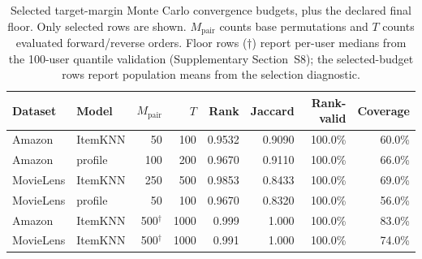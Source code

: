 \begin{table}[t]\centering\small
\caption{Selected target-margin Monte Carlo convergence budgets, plus the declared final floor. Only selected rows are shown. $M_{\mathrm{pair}}$ counts base permutations and $T$ counts evaluated forward/reverse orders. Floor rows ($\dagger$) report per-user medians from the 100-user quantile validation (Supplementary Section~S8); the selected-budget rows report population means from the selection diagnostic.}
\label{tab:convergence}
\begin{tabular}{llrrrrrr}
\toprule
Dataset & Model & $M_{\mathrm{pair}}$ & $T$ & Rank & Jaccard & Rank-valid & Coverage \\
\midrule
Amazon & ItemKNN & 50 & 100 & 0.9532 & 0.9090 & 100.0\% & 60.0\% \\
Amazon & profile & 100 & 200 & 0.9670 & 0.9110 & 100.0\% & 66.0\% \\
MovieLens & ItemKNN & 250 & 500 & 0.9853 & 0.8433 & 100.0\% & 69.0\% \\
MovieLens & profile & 50 & 100 & 0.9670 & 0.8320 & 100.0\% & 56.0\% \\
\midrule
Amazon & ItemKNN & 500$^\dagger$ & 1000 & 0.999 & 1.000 & 100.0\% & 83.0\% \\
MovieLens & ItemKNN & 500$^\dagger$ & 1000 & 0.991 & 1.000 & 100.0\% & 74.0\% \\
\bottomrule
\end{tabular}
\end{table}